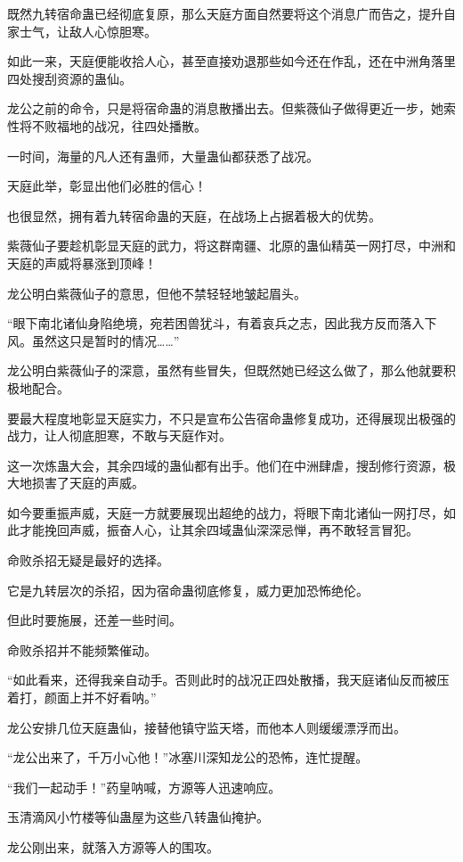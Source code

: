 \begin{this_body}
既然九转宿命蛊已经彻底复原，那么天庭方面自然要将这个消息广而告之，提升自家士气，让敌人心惊胆寒。

如此一来，天庭便能收拾人心，甚至直接劝退那些如今还在作乱，还在中洲角落里四处搜刮资源的蛊仙。

龙公之前的命令，只是将宿命蛊的消息散播出去。但紫薇仙子做得更近一步，她索性将不败福地的战况，往四处播散。

一时间，海量的凡人还有蛊师，大量蛊仙都获悉了战况。

天庭此举，彰显出他们必胜的信心！

也很显然，拥有着九转宿命蛊的天庭，在战场上占据着极大的优势。

紫薇仙子要趁机彰显天庭的武力，将这群南疆、北原的蛊仙精英一网打尽，中洲和天庭的声威将暴涨到顶峰！

龙公明白紫薇仙子的意思，但他不禁轻轻地皱起眉头。

“眼下南北诸仙身陷绝境，宛若困兽犹斗，有着哀兵之志，因此我方反而落入下风。虽然这只是暂时的情况……”

龙公明白紫薇仙子的深意，虽然有些冒失，但既然她已经这么做了，那么他就要积极地配合。

要最大程度地彰显天庭实力，不只是宣布公告宿命蛊修复成功，还得展现出极强的战力，让人彻底胆寒，不敢与天庭作对。

这一次炼蛊大会，其余四域的蛊仙都有出手。他们在中洲肆虐，搜刮修行资源，极大地损害了天庭的声威。

如今要重振声威，天庭一方就要展现出超绝的战力，将眼下南北诸仙一网打尽，如此才能挽回声威，振奋人心，让其余四域蛊仙深深忌惮，再不敢轻言冒犯。

命败杀招无疑是最好的选择。

它是九转层次的杀招，因为宿命蛊彻底修复，威力更加恐怖绝伦。

但此时要施展，还差一些时间。

命败杀招并不能频繁催动。

“如此看来，还得我亲自动手。否则此时的战况正四处散播，我天庭诸仙反而被压着打，颜面上并不好看呐。”

龙公安排几位天庭蛊仙，接替他镇守监天塔，而他本人则缓缓漂浮而出。

“龙公出来了，千万小心他！”冰塞川深知龙公的恐怖，连忙提醒。

“我们一起动手！”药皇呐喊，方源等人迅速响应。

玉清滴风小竹楼等仙蛊屋为这些八转蛊仙掩护。

龙公刚出来，就落入方源等人的围攻。


\end{this_body}
